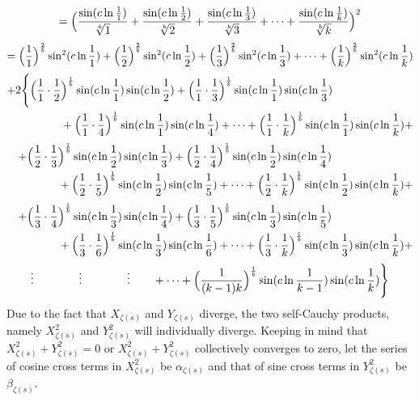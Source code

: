 \documentclass{amsart}
\begin{document}
	\[ = \Bigl( \frac{\sin({c\ln \frac{1}{1}})}{\sqrt[b]{1}} + \frac{\sin({c\ln \frac{1}{2}})}{\sqrt[b]{2}} + \frac{\sin({c\ln \frac{1}{3}})}{\sqrt[b]{3}} + \dots + \frac{\sin({c\ln \frac{1}{k}})}{\sqrt[b]{k}} \Bigr)^2 \]
	\[ = \Bigl( \frac{1}{1} \Bigr)^{\frac2b}\sin^2({c \ln \frac{1}{1}}) + \Bigl( \frac{1}{2} \Bigr)^{\frac2b}\sin^2({c \ln \frac{1}{2}}) + \Bigl( \frac{1}{3} \Bigr)^{\frac2b}\sin^2({c \ln \frac{1}{3}}) + \dots + \Bigl( \frac{1}{k} \Bigr)^{\frac2b}\sin^2({c \ln \frac{1}{k}}) \]
	\[
	\begin{aligned}
		+2\Biggl\{ \Bigl( \frac{1}{1} \cdot \frac{1}{2}& \Bigr)^\frac1b \sin(c \ln \frac{1}{1}) \sin(c \ln \frac{1}{2}) + \Bigl( \frac{1}{1} \cdot \frac{1}{3} \Bigr)^\frac1b \sin(c \ln \frac{1}{1}) \sin(c \ln \frac{1}{3}) \\ 
		& + \Bigl( \frac{1}{1} \cdot \frac{1}{4} \Bigr)^\frac1b \sin(c \ln \frac{1}{1}) \sin(c \ln \frac{1}{4}) + \dots + \Bigl( \frac{1}{1} \cdot \frac{1}{k} \Bigr)^\frac1b \sin(c \ln \frac{1}{1}) \sin(c \ln \frac{1}{k}) + \\ 		
	\end{aligned}
	\]
	\[
	\begin{aligned}
		\quad + \Bigl( \frac{1}{2} \cdot \frac{1}{3}& \Bigr)^\frac1b \sin(c \ln \frac{1}{2}) \sin(c \ln \frac{1}{3}) + \Bigl( \frac{1}{2} \cdot \frac{1}{4} \Bigr)^\frac1b \sin(c \ln \frac{1}{2}) \sin(c \ln \frac{1}{4}) \\ 
		& + \Bigl( \frac{1}{2} \cdot \frac{1}{5} \Bigr)^\frac1b \sin(c \ln \frac{1}{2}) \sin(c \ln \frac{1}{5}) + \dots + \Bigl( \frac{1}{2} \cdot \frac{1}{k} \Bigr)^\frac1b \sin(c \ln \frac{1}{2}) \sin(c \ln \frac{1}{k}) + \\ 		
	\end{aligned}
	\]
	\[
	\begin{aligned}
		\quad + \Bigl( \frac{1}{3} \cdot \frac{1}{4}& \Bigr)^\frac1b \sin(c \ln \frac{1}{3}) \sin(c \ln \frac{1}{4}) + \Bigl( \frac{1}{3} \cdot \frac{1}{5} \Bigr)^\frac1b \sin(c \ln \frac{1}{3}) \sin(c \ln \frac{1}{5}) \\ 
		& + \Bigl( \frac{1}{3} \cdot \frac{1}{6} \Bigr)^\frac1b \sin(c \ln \frac{1}{3}) \sin(c \ln \frac{1}{6}) + \dots + \Bigl( \frac{1}{3} \cdot \frac{1}{k} \Bigr)^\frac1b \sin(c \ln \frac{1}{3}) \sin(c \ln \frac{1}{k}) + \\ 		
	\end{aligned}
	\]
	\[
	\begin{aligned}
		\vdots \qquad\qquad \vdots \qquad\qquad \vdots \qquad + \dots + \Bigl( \frac{1}{(k-1)k} \Bigr)^\frac1b \sin(c \ln \frac{1}{k-1}) \sin(c \ln \frac{1}{k}) \Biggr\}
	\end{aligned}
	\]
	\[\]
	Due to the fact that $X_{\zeta(s)}$ and $Y_{\zeta(s)}$ diverge, the two self-Cauchy products, namely $X_{\zeta(s)}^2$ and $Y_{\zeta(s)}^2$ will individually diverge. Keeping in mind that $X_{\zeta(s)}^2 + Y_{\zeta(s)}^2 = 0$ or $X_{\zeta(s)}^2 + Y_{\zeta(s)}^2$ collectively converges to zero, let the series of cosine cross terms in $X_{\zeta(s)}^2$ be $\alpha_{\zeta(s)}$ and that of sine cross terms in $Y_{\zeta(s)}^2$ be $\beta_{\zeta(s)}$.
	
\end{document}
